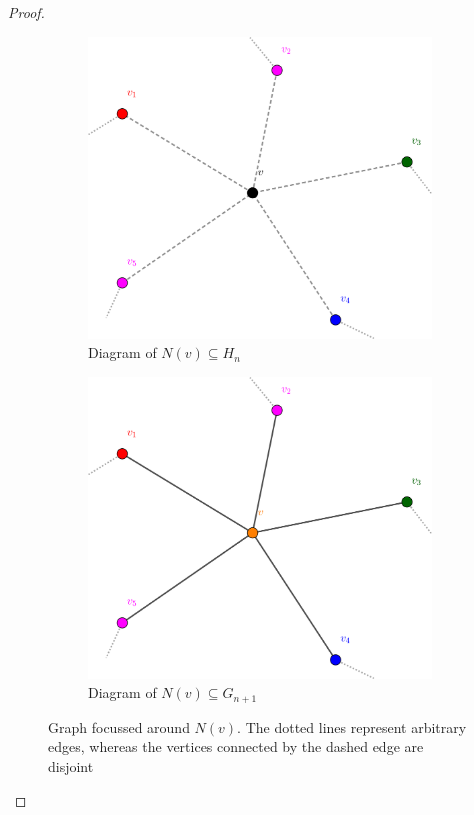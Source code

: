 \begin{proof}
\begin{figure}[H]
\centering
\begin{subfigure}[H]{0.49\textwidth}
\includegraphics[width=\textwidth]{img/case1_first.pdf}
\caption{Diagram of $N(v) \subseteq H_{n}$}
\label{fig:case1_first}
\end{subfigure}
\begin{subfigure}[H]{0.49\textwidth}
\includegraphics[width=\textwidth]{img/case1_second.pdf}
\caption{Diagram of $N(v) \subseteq G_{n + 1}$}
\label{fig:case1_second}
\end{subfigure}
\caption{Graph focussed around $N(v)$. The dotted lines represent arbitrary edges, whereas the vertices connected by the dashed edge are disjoint}
\end{figure}


\end{proof}

